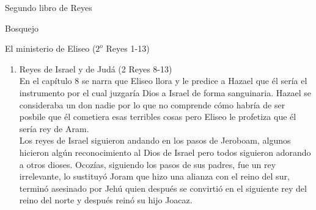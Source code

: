 \begin{section}{Segundo libro de Reyes}
\begin{subsection}{Bosquejo}
\begin{subsubsection}{El ministerio de Eliseo ($2^{o}$ Reyes 1-13)}
\begin{enumerate}
					Nosotros en la actualidad vivimos en medio de un pueblo pagano pues vemos que la myoría adora imágenes y esculturas, así como le creen más a los hombres que a Dios. En muchas ocasiones ni siquiera sabemos cómo actuar ante estas situaciones. El conocer quiénes somos y a quién adoramos nos confirma el saber que lo que hacemos no tiene algo malo. Nosotros sabemos a quien adorar y lo que pase alrededor de nosotros no tiene valor.\\
					A partir de $2^{o}$ Reyes 5:20 se narra que un siervo de Eliseo, Giezi, va a cobrarle a Naamán con engaños y le saca dinero y vestidos para él. Giezi pudo haber llegado a ser quizá sustituto de Eliseo pero su codicia lo hizo fallar y por consecuencia de su pecado la lepra de Naamán se le pega a Giezi.\\
					Lo que debemos de buscar siempre es fortaleza en Dios para evadir estas tentaciones que siempre se presentan y así evitar que caigamos en ellas.\\
					En el capítulo 6 pasan dos milagros más pues Eliseo hace flotar la cabeza de un hacha sobre el agua del río Jordan y despúes cega al ejército arameo para evitar que lo atraparan.\\
					En el capítulo 7 Dios hace huir al ejército enemigo haciéndoles crees que numeroso ejército se acercaba a su campamento y por la prisa dejaron todas sus provisiones con las que el pueblo de Israel pudo salir a comer.
				\item Reyes de Israel y de Judá (2 Reyes 8-13)\\
En el capítulo 8 se narra que Eliseo llora y le predice a Hazael que él sería el instrumento por el cual juzgaría Dios a Israel de forma sanguinaria. Hazael se consideraba un don nadie por lo que no comprende cómo habría de ser posbile que él cometiera esas terribles cosas pero Eliseo le profetiza que él sería rey de Aram.\\
Los reyes de Israel siguieron andando en los pasos de Jeroboam, algunos hicieron algún reconocimiento al Dios de Israel pero todos siguieron adorando a otros dioses. 
\newpage
Ocozías, siguiendo los pasos de sus padres, fue un rey irrelevante, lo sustituyó Joram que hizo una alianza con el reino del sur, terminó asesinado por Jehú quien después se convirtió en el siguiente rey del reino del norte y después reinó su hijo Joacaz.\\

\end{enumerate}
\end{subsubsection}
\end{subsection}
\end{section}

